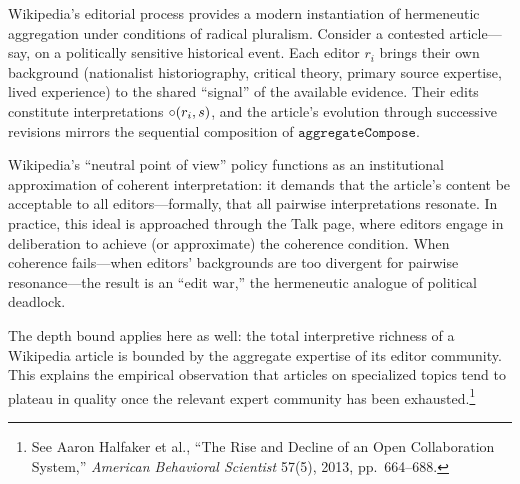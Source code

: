 \begin{example}
\label{ex:wikipedia_consensus}
Wikipedia's editorial process provides a modern instantiation of hermeneutic
aggregation under conditions of radical pluralism.  Consider a contested
article---say, on a politically sensitive historical event.  Each editor
$r_i$ brings their own background (nationalist historiography, critical
theory, primary source expertise, lived experience) to the shared
``signal'' of the available evidence.  Their edits constitute interpretations
$\circ(r_i, s)$, and the article's evolution through successive revisions
mirrors the sequential composition of $\texttt{aggregateCompose}$.

Wikipedia's ``neutral point of view'' policy functions as an institutional
approximation of coherent interpretation: it demands that the article's
content be acceptable to all editors---formally, that all pairwise
interpretations resonate.  In practice, this ideal is approached through
the Talk page, where editors engage in deliberation to achieve (or
approximate) the coherence condition.  When coherence fails---when editors'
backgrounds are too divergent for pairwise resonance---the result is an
``edit war,'' the hermeneutic analogue of political deadlock.

The depth bound applies here as well: the total interpretive richness of a
Wikipedia article is bounded by the aggregate expertise of its editor
community.  This explains the empirical observation that articles on
specialized topics tend to plateau in quality once the relevant expert
community has been exhausted.\footnote{See Aaron Halfaker et al.,
``The Rise and Decline of an Open Collaboration System,''
\textit{American Behavioral Scientist} 57(5), 2013, pp.\ 664--688.}
\end{example}

